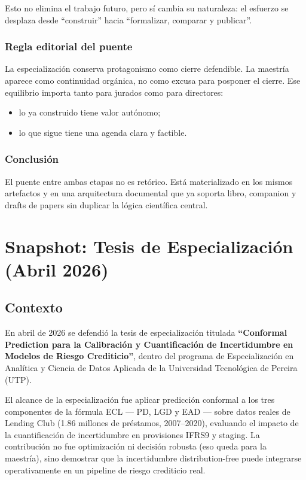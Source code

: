 \documentclass[
  spanish,
  11pt,
  letterpaper,
]{scrbook}
\providecommand{\tightlist}{%
  \setlength{\itemsep}{0pt}\setlength{\parskip}{0pt}}
\theoremstyle{plain}
\theoremstyle{remark}
\begin{document}
Esto no elimina el trabajo futuro, pero sí cambia su naturaleza: el
esfuerzo se desplaza desde ``construir'' hacia ``formalizar, comparar y
publicar''.

\subsection{Regla editorial del
puente}\label{regla-editorial-del-puente}

La especialización conserva protagonismo como cierre defendible. La
maestría aparece como continuidad orgánica, no como excusa para posponer
el cierre. Ese equilibrio importa tanto para jurados como para
directores:

\begin{itemize}
\tightlist
\item
  lo ya construido tiene valor autónomo;
\item
  lo que sigue tiene una agenda clara y factible.
\end{itemize}

\subsection{Conclusión}\label{conclusiuxf3n-1}

El puente entre ambas etapas no es retórico. Está materializado en los
mismos artefactos y en una arquitectura documental que ya soporta libro,
companion y drafts de papers sin duplicar la lógica científica central.

\chapter{Snapshot: Tesis de Especialización (Abril
2026)}\label{snapshot-tesis-de-especializaciuxf3n-abril-2026}

\section{Contexto}\label{sec-specialization-snapshot}

En abril de 2026 se defendió la tesis de especialización titulada
\textbf{``Conformal Prediction para la Calibración y Cuantificación de
Incertidumbre en Modelos de Riesgo Crediticio''}, dentro del programa de
Especialización en Analítica y Ciencia de Datos Aplicada de la
Universidad Tecnológica de Pereira (UTP).

El alcance de la especialización fue aplicar predicción conformal a los
tres componentes de la fórmula ECL --- PD, LGD y EAD --- sobre datos
reales de Lending Club (1.86 millones de préstamos, 2007--2020),
evaluando el impacto de la cuantificación de incertidumbre en
provisiones IFRS9 y staging. La contribución no fue optimización ni
decisión robusta (eso queda para la maestría), sino demostrar que la
incertidumbre distribution-free puede integrarse operativamente en un
pipeline de riesgo crediticio real.
\end{document}
